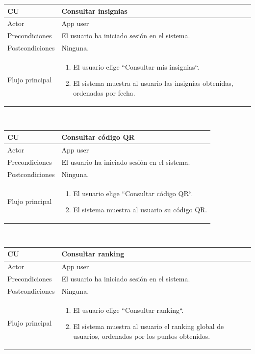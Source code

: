 \documentclass[twoside]{report}
\newcommand\addrow[2]{#1 &#2\\ }
\newcommand\addheading[2]{#1 &#2\\ \hline}
\newcommand\tabularhead{\begin{tabular}{lp{0.7\textwidth}}
\hline
}
\newenvironment{usecase}{\tabularhead}
{\hline\end{tabular}}
\begin{document}
\begin{usecase}
  \addheading{\textbf{CU\arabic{usecase}}}{Consultar insignias} 
  \addrow{Actor}{App user}
  \addrow{Precondiciones}{El usuario ha iniciado sesión en el sistema.}
  \addrow{Postcondiciones}{Ninguna.}
  \addrow{Flujo principal}{
  		\begin{enumerate}
  		\item El usuario elige “Consultar mis insignias“.
  		\item El sistema muestra al usuario las insignias obtenidas, ordenadas por fecha.
  		\end{enumerate}
  }
\end{usecase}\\

\begin{usecase}
  \addheading{\textbf{CU\arabic{usecase}}}{Consultar código QR} 
  \addrow{Actor}{App user}
  \addrow{Precondiciones}{El usuario ha iniciado sesión en el sistema.}
  \addrow{Postcondiciones}{Ninguna.}
  \addrow{Flujo principal}{
  		\begin{enumerate}
  		\item El usuario elige “Consultar código QR“.
  		\item El sistema muestra al usuario su código QR.
  		\end{enumerate}
  }
\end{usecase}\\

\begin{usecase}
  \addheading{\textbf{CU\arabic{usecase}}}{Consultar ranking} 
  \addrow{Actor}{App user}
  \addrow{Precondiciones}{El usuario ha iniciado sesión en el sistema.}
  \addrow{Postcondiciones}{Ninguna.}
  \addrow{Flujo principal}{
  		\begin{enumerate}
  		\item El usuario elige “Consultar ranking“.
  		\item El sistema muestra al usuario el ranking global de usuarios, ordenados por los puntos obtenidos.
  		\end{enumerate}
  }
\end{usecase}\\
\end{document}
